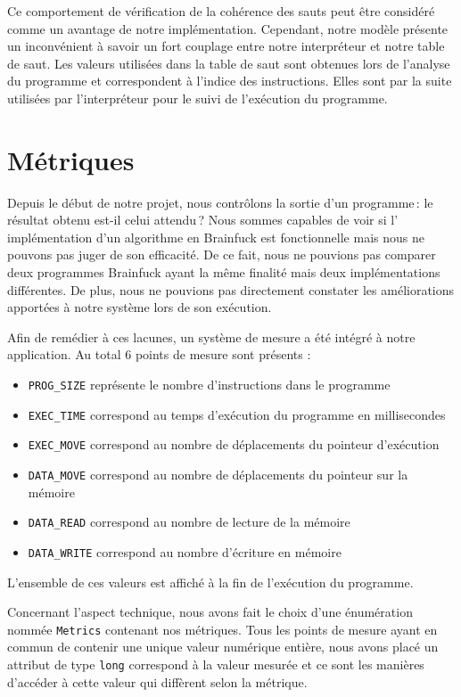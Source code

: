 \documentclass[titlepage]{article}
\begin{document}
    Ce comportement de vérification de la cohérence des sauts peut être considéré comme un avantage de notre implémentation. Cependant, notre modèle présente un inconvénient à savoir un fort couplage entre notre interpréteur et notre table de saut. Les valeurs utilisées dans la table de saut sont obtenues lors de l'analyse du programme et correspondent à l'indice des instructions. Elles sont par la suite utilisées par l'interpréteur pour le suivi de l’exécution du programme.

\section{Métriques}


    Depuis le début de notre projet, nous contrôlons la sortie d'un programme : le résultat obtenu est-il celui attendu ? Nous sommes capables de voir si l' implémentation d'un algorithme en Brainfuck est fonctionnelle mais nous ne pouvons pas juger de son efficacité. De ce fait, nous ne pouvions pas comparer deux programmes Brainfuck ayant la même finalité mais deux implémentations différentes. De plus, nous ne pouvions pas directement constater les améliorations apportées à notre système lors de son exécution.


    Afin de remédier à ces lacunes, un système de mesure a été intégré à notre application. Au total 6 points de mesure sont présents : 


\begin{itemize}
	\item \texttt{PROG\_SIZE} représente le nombre d'instructions dans le programme
	\item \texttt{EXEC\_TIME} correspond au temps d'exécution du programme en millisecondes
	\item \texttt{EXEC\_MOVE} correspond au nombre de déplacements du pointeur d'exécution
	\item \texttt{DATA\_MOVE} correspond au nombre de déplacements du pointeur sur la mémoire
	\item \texttt{DATA\_READ} correspond au nombre de lecture de la mémoire
	\item \texttt{DATA\_WRITE} correspond au nombre d'écriture en mémoire
\end{itemize}

    L'ensemble de ces valeurs est affiché à la fin de l'exécution du programme.



    Concernant l'aspect technique, nous avons fait le choix d'une énumération nommée \texttt{Metrics} contenant nos métriques. Tous les points de mesure ayant en commun de contenir une unique valeur numérique entière, nous avons placé un attribut de type \texttt{long} correspond à la valeur mesurée et ce sont les manières d'accéder à cette valeur qui diffèrent selon la métrique. 
\end{document}

